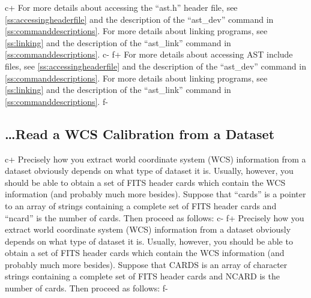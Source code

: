 \documentclass[twoside,11pt]{article}
\newcommand{\appref}[1]{Appendix~\ref{#1}}
\newcommand{\secref}[1]{\S\ref{#1}}
\renewcommand{\appref}[1]{\ref{#1}}
\renewcommand{\secref}[1]{\ref{#1}}
\begin{document}
c+
For more details about accessing the ``ast.h'' header file, see
\secref{ss:accessingheaderfile} and the description of the
``ast\_dev'' command in \appref{ss:commanddescriptions}.  For more
details about linking programs, see \secref{ss:linking} and the
description of the ``ast\_link'' command in
\appref{ss:commanddescriptions}.
c-
f+
For more details about accessing AST include files, see
\secref{ss:accessingheaderfile} and the description of the
``ast\_dev'' command in \appref{ss:commanddescriptions}.  For more
details about linking programs, see \secref{ss:linking} and the
description of the ``ast\_link'' command in
\appref{ss:commanddescriptions}.
f-

\subsection{\label{ss:howtoreadwcs}\ldots Read a WCS Calibration from a Dataset}

c+
Precisely how you extract world coordinate system (WCS) information
from a dataset obviously depends on what type of dataset it
is. Usually, however, you should be able to obtain a set of FITS
header cards which contain the WCS information (and probably much more
besides). Suppose that ``cards'' is a pointer to an array of strings
containing a complete set of FITS header cards and ``ncard'' is the
number of cards. Then proceed as follows:
c-
f+
Precisely how you extract world coordinate system (WCS) information
from a dataset obviously depends on what type of dataset it
is. Usually, however, you should be able to obtain a set of FITS
header cards which contain the WCS information (and probably much more
besides). Suppose that CARDS is an array of character strings
containing a complete set of FITS header cards and NCARD is the number
of cards. Then proceed as follows:
f-
\end{document}
